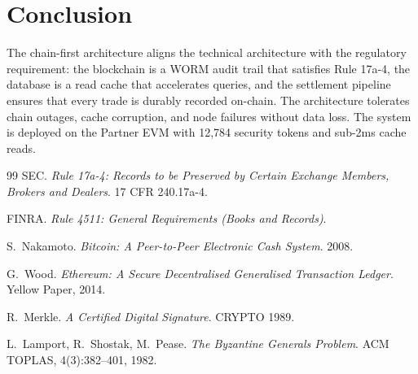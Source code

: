 \documentclass[11pt,a4paper]{article}
\begin{document}
\section{Conclusion}
\label{sec:conclusion}

The chain-first architecture aligns the technical architecture with
the regulatory requirement: the blockchain is a WORM audit trail that
satisfies Rule 17a-4, the database is a read cache that accelerates
queries, and the settlement pipeline ensures that every trade is
durably recorded on-chain.  The architecture tolerates chain outages,
cache corruption, and node failures without data loss.  The system
is deployed on the Partner EVM with 12,784 security tokens and
sub-2ms cache reads.

\begin{thebibliography}{99}
SEC.
\emph{Rule 17a-4: Records to be Preserved by Certain Exchange Members,
Brokers and Dealers}.
17 CFR 240.17a-4.

FINRA.
\emph{Rule 4511: General Requirements (Books and Records)}.

S.~Nakamoto.
\emph{Bitcoin: A Peer-to-Peer Electronic Cash System}.
2008.

G.~Wood.
\emph{Ethereum: A Secure Decentralised Generalised Transaction Ledger}.
Yellow Paper, 2014.

R.~Merkle.
\emph{A Certified Digital Signature}.
CRYPTO 1989.

L.~Lamport, R.~Shostak, M.~Pease.
\emph{The Byzantine Generals Problem}.
ACM TOPLAS, 4(3):382--401, 1982.
\end{thebibliography}
\end{document}
